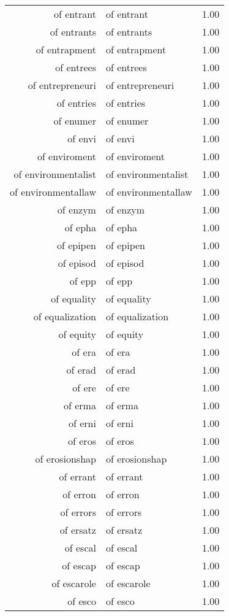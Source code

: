 \begin{table}[ht]
\begin{tabular}{rlr}
  of entrant & of entrant & 1.00 \\ 
  of entrants & of entrants & 1.00 \\ 
  of entrapment & of entrapment & 1.00 \\ 
  of entrees & of entrees & 1.00 \\ 
  of entrepreneuri & of entrepreneuri & 1.00 \\ 
  of entries & of entries & 1.00 \\ 
  of enumer & of enumer & 1.00 \\ 
  of envi & of envi & 1.00 \\ 
  of enviroment & of enviroment & 1.00 \\ 
  of environmentalist & of environmentalist & 1.00 \\ 
  of environmentallaw & of environmentallaw & 1.00 \\ 
  of enzym & of enzym & 1.00 \\ 
  of epha & of epha & 1.00 \\ 
  of epipen & of epipen & 1.00 \\ 
  of episod & of episod & 1.00 \\ 
  of epp & of epp & 1.00 \\ 
  of equality & of equality & 1.00 \\ 
  of equalization & of equalization & 1.00 \\ 
  of equity & of equity & 1.00 \\ 
  of era & of era & 1.00 \\ 
  of erad & of erad & 1.00 \\ 
  of ere & of ere & 1.00 \\ 
  of erma & of erma & 1.00 \\ 
  of erni & of erni & 1.00 \\ 
  of eros & of eros & 1.00 \\ 
  of erosionshap & of erosionshap & 1.00 \\ 
  of errant & of errant & 1.00 \\ 
  of erron & of erron & 1.00 \\ 
  of errors & of errors & 1.00 \\ 
  of ersatz & of ersatz & 1.00 \\ 
  of escal & of escal & 1.00 \\ 
  of escap & of escap & 1.00 \\ 
  of escarole & of escarole & 1.00 \\ 
  of esco & of esco & 1.00 \\ 

\end{tabular}
\end{table}
